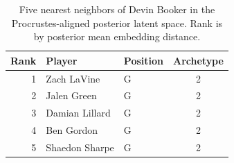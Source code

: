 \begin{table}[htbp]
  \centering\small
  \begin{tabular}{rllc}
    \toprule
    Rank & Player & Position & Archetype \\
    \midrule
    1 & Zach LaVine & G & 2 \\
    2 & Jalen Green & G & 2 \\
    3 & Damian Lillard & G & 2 \\
    4 & Ben Gordon & G & 2 \\
    5 & Shaedon Sharpe & G & 2 \\
    \bottomrule
  \end{tabular}
  \caption{Five nearest neighbors of Devin Booker in the Procrustes-aligned posterior latent space. Rank is by posterior mean embedding distance.}
  \label{tab:Devin_Booker_neighbors}
\end{table}

